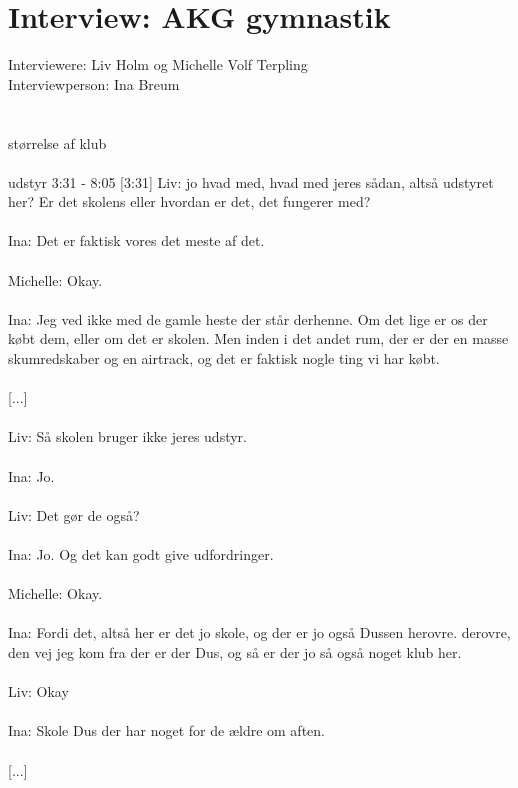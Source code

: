 \chapter{Interview: AKG gymnastik}\label{ch:appDlabel}
Interviewere: Liv Holm og Michelle Volf Terpling\\
Interviewperson: Ina Breum\\
\\\\
størrelse af klub
\\\\
udstyr 3:31 - 8:05
[3:31]
Liv: jo hvad med, hvad med jeres sådan, altså udstyret her? Er det skolens eller hvordan er det, det fungerer med?
\\\\
Ina: Det er faktisk vores det meste af det. 
\\\\
Michelle: Okay.
\\\\
Ina: Jeg ved ikke med de gamle heste der står derhenne. Om det lige er os der købt dem, eller om det er skolen. Men inden i det andet rum, der er der en masse skumredskaber og en airtrack, og det er faktisk nogle ting vi har købt. 
\\\\
[...]
 \\\\
[4:27]
Liv: Så skolen bruger ikke jeres udstyr.
\\\\
Ina: Jo. 
\\\\
Liv: Det gør de også?
\\\\
Ina: Jo. Og det kan godt give udfordringer. 
\\\\
Michelle: Okay.
\\\\
Ina: Fordi det, altså her er det jo skole, og der er jo også Dussen herovre. derovre, den vej jeg kom fra der er der Dus, og så er der jo så også noget klub her. 
\\\\
Liv: Okay
\\\\
Ina: Skole Dus der har noget for de ældre om aften. 
\\\\
[...]
\\\\
